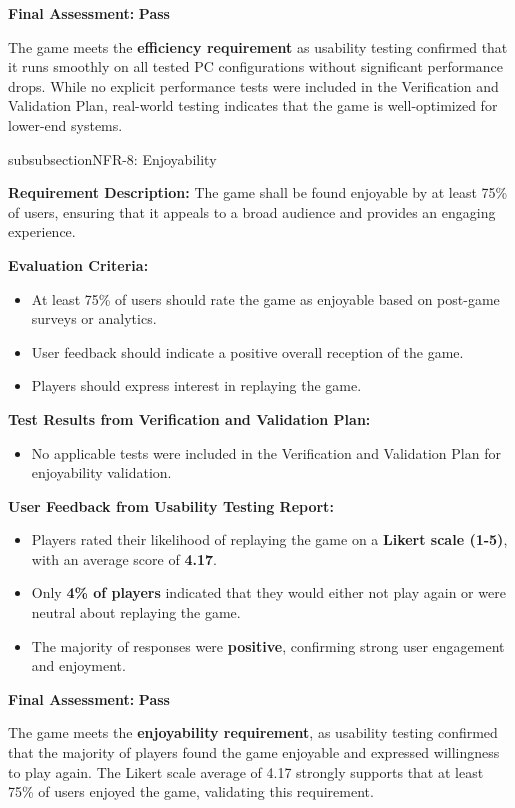 \documentclass[12pt, titlepage]{article}
\begin{document}
\textbf{Final Assessment:} \textbf{Pass} 
 
The game meets the \textbf{efficiency requirement} as usability testing confirmed that it runs smoothly on all tested PC configurations without significant performance drops. While no explicit performance tests were included in the Verification and Validation Plan, real-world testing indicates that the game is well-optimized for lower-end systems.


\*subsubsection{NFR-8: Enjoyability}

\textbf{Requirement Description:}  
The game shall be found enjoyable by at least 75\% of users, ensuring that it appeals to a broad audience and provides an engaging experience.

\textbf{Evaluation Criteria:}  
\begin{itemize}
    \item At least 75\% of users should rate the game as enjoyable based on post-game surveys or analytics.
    \item User feedback should indicate a positive overall reception of the game.
    \item Players should express interest in replaying the game.
\end{itemize}

\textbf{Test Results from Verification and Validation Plan:}  
\begin{itemize}
    \item No applicable tests were included in the Verification and Validation Plan for enjoyability validation.
\end{itemize}

\textbf{User Feedback from Usability Testing Report:}  
\begin{itemize}
    \item Players rated their likelihood of replaying the game on a \textbf{Likert scale (1-5)}, with an average score of \textbf{4.17}.
    \item Only \textbf{4\% of players} indicated that they would either not play again or were neutral about replaying the game.
    \item The majority of responses were \textbf{positive}, confirming strong user engagement and enjoyment.
\end{itemize}

\textbf{Final Assessment:} \textbf{Pass} 
 
The game meets the \textbf{enjoyability requirement}, as usability testing confirmed that the majority of players found the game enjoyable and expressed willingness to play again. The Likert scale average of 4.17 strongly supports that at least 75\% of users enjoyed the game, validating this requirement.
\end{document}
